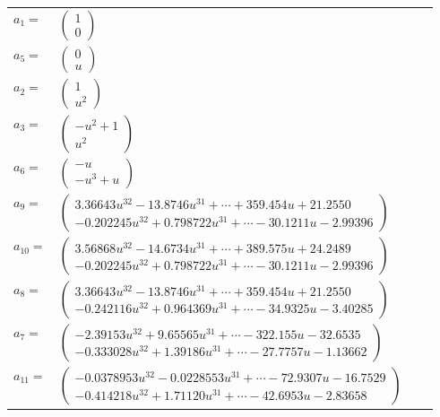 \documentclass[1p]{elsarticle_modified}
\theoremstyle{definition}
\begin{document}
\begin{tabular}{m{7pt} m{180pt} m{7pt} m{180pt} }
\flushright $a_{1}=$&$\begin{pmatrix}1\\0\end{pmatrix}$ \\
\flushright $a_{5}=$&$\begin{pmatrix}0\\u\end{pmatrix}$ \\
\flushright $a_{2}=$&$\begin{pmatrix}1\\u^2\end{pmatrix}$ \\
\flushright $a_{3}=$&$\begin{pmatrix}- u^2+1\\u^2\end{pmatrix}$ \\
\flushright $a_{6}=$&$\begin{pmatrix}- u\\- u^3+u\end{pmatrix}$ \\
\flushright $a_{9}=$&$\begin{pmatrix}3.36643 u^{32}-13.8746 u^{31}+\cdots+359.454 u+21.2550\\-0.202245 u^{32}+0.798722 u^{31}+\cdots-30.1211 u-2.99396\end{pmatrix}$ \\
\flushright $a_{10}=$&$\begin{pmatrix}3.56868 u^{32}-14.6734 u^{31}+\cdots+389.575 u+24.2489\\-0.202245 u^{32}+0.798722 u^{31}+\cdots-30.1211 u-2.99396\end{pmatrix}$ \\
\flushright $a_{8}=$&$\begin{pmatrix}3.36643 u^{32}-13.8746 u^{31}+\cdots+359.454 u+21.2550\\-0.242116 u^{32}+0.964369 u^{31}+\cdots-34.9325 u-3.40285\end{pmatrix}$ \\
\flushright $a_{7}=$&$\begin{pmatrix}-2.39153 u^{32}+9.65565 u^{31}+\cdots-322.155 u-32.6535\\-0.333028 u^{32}+1.39186 u^{31}+\cdots-27.7757 u-1.13662\end{pmatrix}$ \\
\flushright $a_{11}=$&$\begin{pmatrix}-0.0378953 u^{32}-0.0228553 u^{31}+\cdots-72.9307 u-16.7529\\-0.414218 u^{32}+1.71120 u^{31}+\cdots-42.6953 u-2.83658\end{pmatrix}$ \\

\end{tabular}
\end{document}
